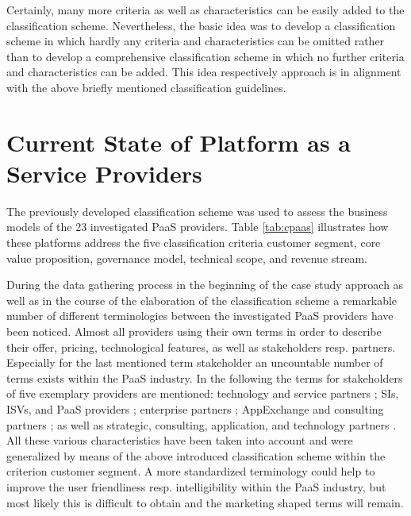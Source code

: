 Certainly, many more criteria as well as characteristics can be easily added to the classification scheme. Nevertheless, the basic idea was to develop a classification scheme in which hardly any criteria and characteristics can be omitted rather than to develop a comprehensive classification scheme in which no further criteria and characteristics can be added. This idea respectively approach is in alignment with the above briefly mentioned classification guidelines.

\section{Current State of Platform as a Service Providers}\label{ch:sota:cPaaS}

The previously developed classification scheme was used to assess the business models of the 23 investigated \ac{PaaS} providers. Table \ref{tab:cpaas} illustrates how these platforms address the five classification criteria customer segment, core value proposition, governance model, technical scope, and revenue stream. 

During the data gathering process in the beginning of the case study approach as well as in the course of the elaboration of the classification scheme a remarkable number of different terminologies between the investigated \ac{PaaS} providers have been noticed. Almost all providers using their own terms in order to describe their offer, pricing, technological features, as well as stakeholders resp. partners. Especially for the last mentioned term stakeholder an uncountable number of terms exists within the \ac{PaaS} industry. In the following the terms for stakeholders of five exemplary providers are mentioned: technology and service partners \citep{CloudBees2013}; \acp{SI}, \acp{ISV}, and \ac{PaaS} providers \citep{Dell2013}; enterprise partners \citep{OrangeScape2013}; AppExchange and consulting partners \citep{Salesforce.com2013}; as well as strategic, consulting, application, and technology partners \citep{Workday2013}. All these various characteristics have been taken into account and were generalized by means of the above introduced classification scheme within the criterion customer segment. A more standardized terminology could help to improve the user friendliness resp. intelligibility within the \ac{PaaS} industry, but most likely this is difficult to obtain and the marketing shaped terms will remain.

